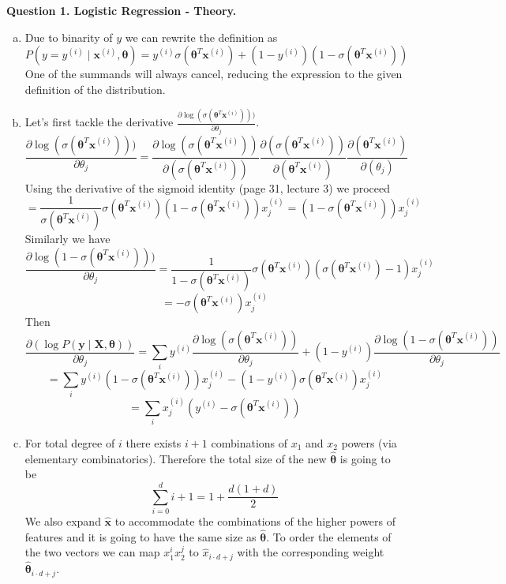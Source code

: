 \documentclass[12pt]{article}
\begin{document}
\noindent


\noindent\textbf{Question 1. Logistic Regression - Theory.}
\begin{enumerate}[a)]
    \item 
    Due to binarity of $y$ we can rewrite the definition as 
$$P(y = y^{(i)}  \mid \bm{x}^{(i)}, \bm{\theta}) =  y^{(i)}  \sigma (\bm{\theta}^T \bm{x}^{(i)}) + 
(1-y^{(i)}) (1- \sigma (\bm{\theta}^T \bm{x}^{(i)}))
$$
One of the summands will always cancel, reducing the expression to the given definition of the distribution.
 \item Let's first tackle the derivative 
 $\frac{\partial \log (\sigma(\bm{\theta}^T \bm{x}^{(i)})))}{\partial \theta_j  }$.
 $$
 \frac{\partial \log (\sigma(\bm{\theta}^T \bm{x}^{(i)})))}{\partial \theta_j  }
 = \frac{\partial \log (\sigma(\bm{\theta}^T \bm{x}^{(i)}))}{\partial(\sigma(\bm{\theta}^T \bm{x}^{(i)}))}
 \frac{\partial( \sigma(\bm{\theta}^T \bm{x}^{(i)}))}{\partial( \bm{\theta}^T \bm{x}^{(i)})}
 \frac{\partial( \bm{\theta}^T \bm{x}^{(i)})}{\partial( \theta_j )}$$
 Using the derivative of the sigmoid identity (page 31, lecture 3) we proceed 
 $$=
 \frac{1}{\sigma(\bm{\theta}^T \bm{x}^{(i)})}\sigma(\bm{\theta}^T \bm{x}^{(i)}) (1-\sigma(\bm{\theta}^T \bm{x}^{(i)})) {x}^{(i)}_j
 = (1-\sigma(\bm{\theta}^T \bm{x}^{(i)})) {x}^{(i)}_j $$
 Similarly we have
 $$\frac{\partial \log (1 - \sigma(\bm{\theta}^T \bm{x}^{(i)})))}{\partial \theta_j  } = 
 \frac{1}{1-\sigma(\bm{\theta}^T \bm{x}^{(i)})}
\sigma(\bm{\theta}^T \bm{x}^{(i)}) (\sigma(\bm{\theta}^T \bm{x}^{(i)})-1) {x}^{(i)}_j $$ $$
= - \sigma(\bm{\theta}^T \bm{x}^{(i)}) {x}^{(i)}_j 
 $$
 Then 
 $$\frac{\partial  (\log {P(\bm{y}  \mid \bm{X}, \bm{\theta})})}{\partial \theta_j}
 = \sum_i y^{(i)} \frac{\partial \log (\sigma(\bm{\theta}^T \bm{x}^{(i)})) }{\partial\theta_j }
 +
 (1-y^{(i)}) \frac{\partial \log (1- \sigma(\bm{\theta}^T \bm{x}^{(i)})) }{\partial \theta_j }$$
 $$=
 \sum_i y^{(i)} (1-\sigma(\bm{\theta}^T \bm{x}^{(i)})) {x}^{(i)}_j 
 - 
 (1-y^{(i)}) \sigma(\bm{\theta}^T \bm{x}^{(i)}) {x}^{(i)}_j 
 $$
 $$ = \sum_i {x}^{(i)}_j  (y^{(i)}  - \sigma (\bm{\theta}^T \bm{x}^{(i)}))$$
  \item 
  For total degree of $i$ there exists
  $i+1$ combinations of $x_1$ and $x_2$ powers (via elementary combinatorics). Therefore the total size of the new 
  $\hat{\bm{\theta}}$ is going to be 
  $$\sum_{i=0}^{d} i+1 = 1 + \frac{ d (1 + d)}{2} $$
  We also expand $\hat{\bm{x}}$ to accommodate the combinations of the higher powers of 
  features and it is going to have the same size as $\hat{\bm{\theta}}$. To order the elements of the 
  two vectors we can map $x_1^ix_2^j$ to $\hat{x}_{i\cdot d + j}$
  with the corresponding weight $\hat{\bm{\theta}}_{i\cdot d + j}$.
   
\end{enumerate}
\end{document}
